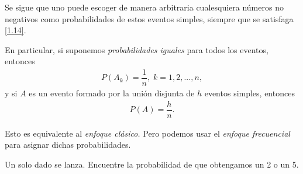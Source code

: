 {}
Se sigue que uno puede escoger de manera arbitraria cualesquiera números no negativos como probabilidades de estos eventos simples, siempre que se satisfaga \eqref{1.14}. 

En particular, si suponemos \emph{probabilidades iguales} para todos los eventos, entonces
\begin{align}
 \label{1.15}
 P(A_{k})=\dfrac{1}{n}, \; k=1,2,...,n,
\end{align}
y si $A$ es un evento formado por la unión disjunta de $h$ eventos simples, entonces
\begin{align}
	\label{1.16}
 P(A)=\dfrac{h}{n}.
\end{align}


{}
\begin{rem}
 Esto es equivalente al \textit{enfoque clásico.} Pero podemos usar el \textit{enfoque frecuencial} para asignar dichas probabilidades.
\end{rem}


{}
\begin{ejemplo}
 \label{exmp:1.12}
 Un solo dado se lanza. Encuentre la probabilidad de que obtengamos un 2 o un 5.
\end{ejemplo}



